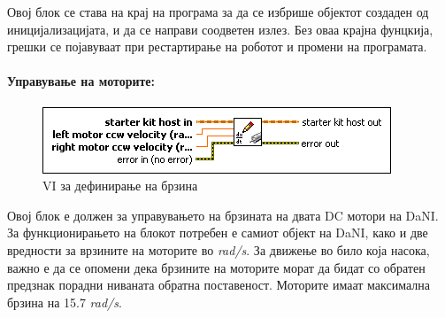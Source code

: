 \documentclass[12pt]{article}
\begin{document}
      Овој блок се става на крај на програма за да се избрише објектот создаден од иницијализацијата, и да се направи соодветен излез. Без оваа крајна фунцкија, грешки се појавуваат при рестартирање на роботот и промени на програмата.
			\\

    \paragraph{Управување на моторите:\\}
      \begin{figure}[h]
				\includegraphics[width=0.55\linewidth]{./images/write_dc.png}
				\raggedright
				\caption{VI за дефинирање на брзина}
				\label{fig:write_dc.png}
				\end{figure}

			Овој блок е должен за управувањето на брзината на двата DC мотори на DaNI. За функционирањето на блокот потребен е самиот објект на DaNI, како и две вредности за врзините на моторите во \textit{rad/s}. За движење во било која насока, важно е да се опомени дека брзините на моторите морат да бидат со обратен предзнак порадни ниваната обратна поставеност. Моторите имаат максимална брзина на 15.7 \textit{rad/s}.
\end{document}
